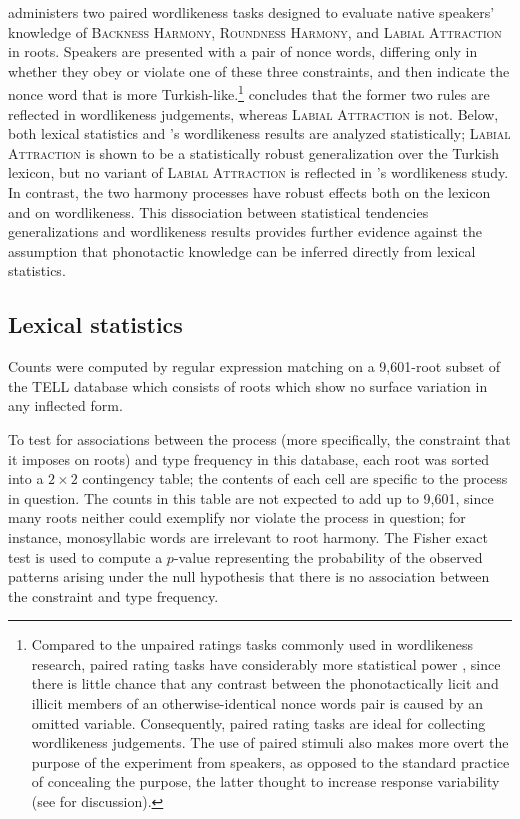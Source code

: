 \citet[311]{Zimmer1969} administers two paired wordlikeness tasks designed to evaluate native speakers' knowledge of \textsc{Backness Harmony}, \textsc{Roundness Harmony}, and \textsc{Labial Attraction} in roots. 
Speakers are presented with a pair of nonce words, differing only in whether they obey or violate one of these three constraints, and then indicate the nonce word that is more Turkish-like.\footnote{
    Compared to the unpaired ratings tasks  commonly used in wordlikeness research, paired rating tasks have considerably more statistical power \citep[e.g.][]{Gigerenzer2004}, since there is little chance that any contrast between the phonotactically licit and illicit members of an otherwise-identical nonce words pair is caused by an omitted variable.
    Consequently, paired rating tasks are ideal for collecting wordlikeness judgements.
    The use of paired stimuli also makes more overt the purpose of the experiment from speakers, as opposed to the standard practice of concealing the purpose, the latter thought to increase response variability (see \citealt[398f.]{Hertwig2001} for discussion).}
\citeauthor{Zimmer1969} concludes that the former two rules are reflected in wordlikeness judgements, whereas \textsc{Labial Attraction} is not. 
Below, both lexical statistics and \citeauthor{Zimmer1969}'s wordlikeness results are analyzed statistically; \textsc{Labial Attraction} is shown to be a statistically robust generalization over the Turkish lexicon, but no variant of \textsc{Labial Attraction} is reflected in \citeauthor{Zimmer1969}'s wordlikeness study. 
In contrast, the two harmony processes have robust effects both on the lexicon and on wordlikeness.  
This dissociation between statistical tendencies  generalizations and wordlikeness results provides further evidence against the assumption that phonotactic knowledge can be inferred directly from lexical statistics.

\subsection{Lexical statistics}

Counts were computed by regular expression matching on a 9,601-root subset of the TELL database which consists of roots which show no surface variation in any inflected form.

To test for associations between the process (more specifically, the constraint that it imposes on roots) and type frequency in this database, each root was sorted into a $2 \times 2$ contingency table; the contents of each cell are specific to the process in question. The counts in this table are not expected to add up to 9,601, since many roots neither could exemplify nor violate the process in question; for instance, monosyllabic words are irrelevant to root harmony. The Fisher exact test is used to compute a $p$-value representing the probability of the observed patterns arising under the null hypothesis that there is no association between the constraint and type frequency.

